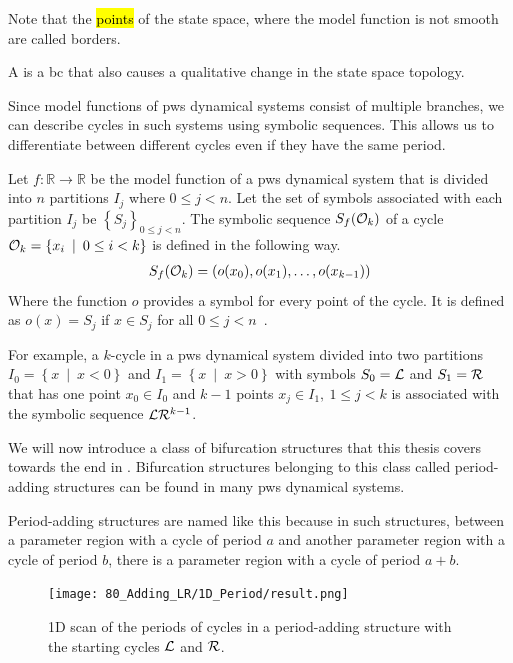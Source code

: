 Note that the \hl{points} of the state space, where the model function is not smooth are called borders.

\begin{definition}
	A  is a \gls{bc} that also causes a qualitative change in the state space topology.
\end{definition}

Since model functions of \gls{pws} dynamical systems consist of multiple branches, we can describe cycles in such systems using symbolic sequences.
This allows us to differentiate between different cycles even if they have the same period.

\begin{definition}
	Let $f: \mathbb{R} \to \mathbb{R}$ be the model function of a \gls{pws} dynamical system that is divided into $n$ partitions $I_j$ where $0 \leq j < n$.
	Let the set of symbols associated with each partition $I_j$ be $\left\{S_j\right\}_{0 \leq j < n}$.
	The symbolic sequence $S_f(\mathcal{O}_k)$ of a cycle $\mathcal{O}_k = \left\{x_i \:\mid\: 0 \leq i < k\right\}$ is defined in the following way.
	\begin{align}
		S_f(\mathcal{O}_k) = \left(o(x_0), o(x_1), \dots, o(x_{k-1})\right)
	\end{align}
	Where the function $o$ provides a symbol for every point of the cycle.
	It is defined as $o(x) = S_j$ if $x \in S_j$ for all $0 \leq j < n$~\cite{granados14adding}.
\end{definition}

For example, a $k$-cycle in a \gls{pws} dynamical system divided into two partitions $I_0 = \left\{x \:\mid\: x < 0\right\}$ and $I_1 = \left\{x \:\mid\: x > 0\right\}$ with symbols $S_0 = \mathcal{L}$ and $S_1 = \mathcal{R}$ that has one point $x_0 \in I_0$ and $k-1$ points $x_j \in I_1, \:1 \leq j < k$ is associated with the symbolic sequence $\mathcal{L}\mathcal{R}^{k-1}$.

We will now introduce a class of bifurcation structures that this thesis covers towards the end in .
Bifurcation structures belonging to this class called period-adding structures can be found in many \gls{pws} dynamical systems.

Period-adding structures are named like this because in such structures, between a parameter region with a cycle of period $a$ and another parameter region with a cycle of period $b$, there is a parameter region with a cycle of period $a + b$.

\begin{figure}
	\centering
	\texttt{[image: 80\_Adding\_LR/1D\_Period/result.png]}
	\caption[1D scan of periods in a period-adding structure between $\L$ and $\R$]{
		1D scan of the periods of cycles in a period-adding structure with the starting cycles $\L$ and $\R$.
	}
\end{figure}

